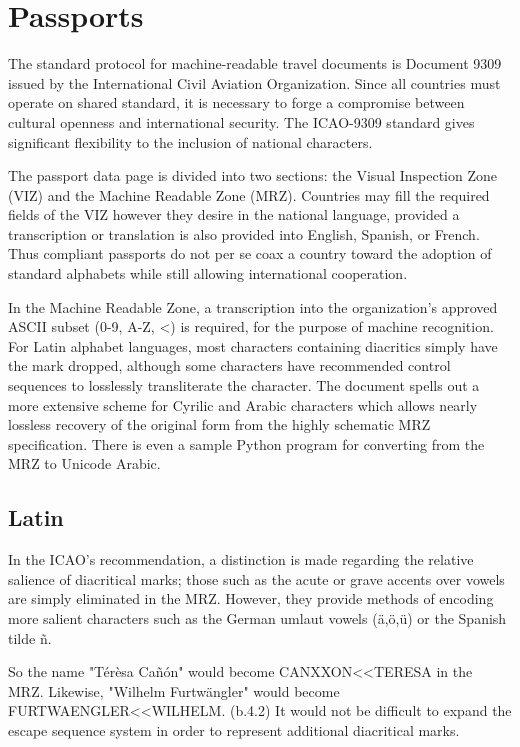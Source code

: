 \section{Passports}

The standard protocol for machine-readable travel documents is Document 9309
issued by the International Civil Aviation Organization. Since all countries
must operate on shared standard, it is necessary to forge a compromise between
cultural openness and international security. The ICAO-9309 standard gives
significant flexibility to the inclusion of national characters.

The passport data page is divided into two sections: the Visual Inspection Zone
(VIZ) and the Machine Readable Zone (MRZ). Countries may fill the required
fields of the VIZ however they desire in the national language, provided a
transcription or translation is also provided into English, Spanish, or French.
Thus compliant passports do not per se coax a country toward the adoption of
standard alphabets while still allowing international cooperation.

In the Machine Readable Zone, a transcription into the organization's approved
ASCII subset (0-9, A-Z, <) is required, for the purpose of machine recognition.
For Latin alphabet languages, most characters containing diacritics simply have
the mark dropped, although some characters have recommended control sequences to
losslessly transliterate the character. The document spells out a more extensive
scheme for Cyrilic and Arabic characters which allows nearly lossless recovery
of the original form from the highly schematic MRZ specification. There is even
a sample Python program for converting from the MRZ to Unicode Arabic.

\subsection{Latin}

In the ICAO's recommendation, a distinction is made regarding the relative
salience of diacritical marks; those such as the acute or grave accents over
vowels are simply eliminated in the MRZ. However, they provide methods of
encoding more salient characters such as the German umlaut vowels (ä,ö,ü) or the
Spanish tilde ñ.

So the name "Térèsa Cañón" would become CANXXON<<TERESA in the MRZ. Likewise,
"Wilhelm Furtwängler" would become FURTWAENGLER<<WILHELM. (b.4.2) It would not
be difficult to expand the escape sequence system in order to represent
additional diacritical marks.

